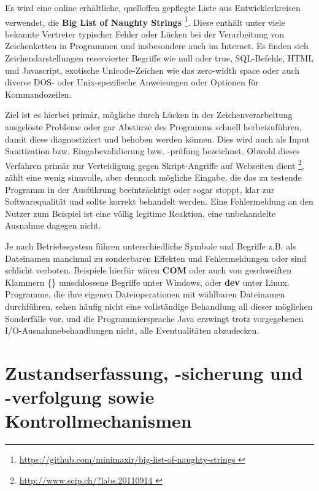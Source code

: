 Es wird eine online erhältliche, quelloffen gepflegte Liste aus Entwicklerkreisen verwendet, 
die \textbf{Big List of Naughty Strings} \footnote{\url{ https://github.com/minimaxir/big-list-of-naughty-strings }}. Diese enthält unter viele bekannte
Vertreter typischer Fehler oder Lücken bei der Verarbeitung von Zeichenketten in Programmen und
insbesondere auch im Internet. Es finden sich Zeichendarstellungen reservierter Begriffe wie
\glqq{}null\grqq{} oder \glqq{}true\grqq{}, SQL-Befehle, HTML und Javascript, exotische Unicode-Zeichen wie das
\glqq{}zero-width space\grqq{} \cite{unicodezerowidth} oder auch diverse DOS- oder Unix-spezifische
Anweisungen oder Optionen für Kommandozeilen.

Ziel ist es hierbei primär, mögliche durch Lücken in der Zeichenverarbeitung ausgelöste Probleme oder gar
Abstürze des Programms schnell herbeizuführen, damit diese diagnostiziert und behoben werden können.
Dies wird auch als \glqq{}Input Sanitization\grqq{} bzw. Eingabevalidierung bzw. -prüfung bezeichnet. 
Obwohl dieses Verfahren primär zur Verteidigung gegen Skript-Angriffe auf Webseiten dient
\footnote{\url{ http://www.scip.ch/?labs.20110914 }}, 
zählt eine wenig sinnvolle, aber dennoch mögliche Eingabe, 
die das zu testende Programm in der Ausführung beeinträchtigt oder sogar stoppt, klar zur 
Softwarequalität und sollte korrekt behandelt werden. Eine Fehlermeldung an den Nutzer zum
Beispiel ist eine völlig legitime Reaktion, eine unbehandelte Ausnahme dagegen nicht.

Je nach Betriebssystem führen unterschiedliche Symbole und Begriffe z.B. als Datei\-namen
manchmal zu sonderbaren Effekten und Fehlermeldungen oder sind schlicht verboten.
Beispiele hierfür wären \textbf{COM} oder auch von geschweiften Klammern \glqq{}\{\}\grqq{} umschlossene
Begriffe unter Windows, oder \textbf{dev} unter Linux. Programme, die ihre eigenen
Dateioperationen mit wählbaren Dateinamen durchführen, sehen häufig nicht eine vollständige
Behandlung all dieser möglichen Sonderfälle vor, und die Programmiersprache Java erzwingt
trotz vorgegebenen I/O-Ausnahme\-behandlungen nicht, alle Eventualitäten abzudecken.


\section{Zustandserfassung, -sicherung und -verfolgung sowie Kontrollmechanismen}\label{section:statemonitoring}


